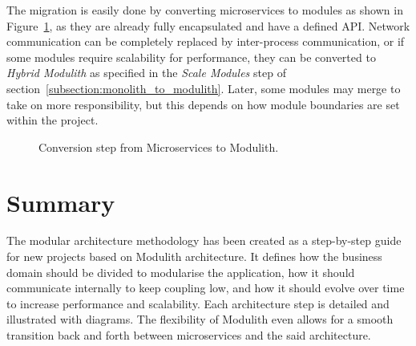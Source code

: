 The migration is easily done by converting microservices to modules as shown in Figure~\ref{fig:microservices_to_modulith_steps}, as they are already fully encapsulated and have a defined API. Network communication can be completely replaced by inter-process communication, or if some modules require scalability for performance, they can be converted to \textit{Hybrid Modulith} as specified in the \textit{Scale Modules} step of section~\ref{subsection:monolith_to_modulith}. Later, some modules may merge to take on more responsibility, but this depends on how module boundaries are set within the project.

\begin{figure}
    \centering
    
    \caption{Conversion step from Microservices to Modulith.\label{fig:microservices_to_modulith_steps}}
\end{figure}

\section{Summary}
The modular architecture methodology has been created as a step-by-step guide for new projects based on Modulith architecture. It defines how the business domain should be divided to modularise the application, how it should communicate internally to keep coupling low, and how it should evolve over time to increase performance and scalability. Each architecture step is detailed and illustrated with diagrams. The flexibility of Modulith even allows for a smooth transition back and forth between microservices and the said architecture.




